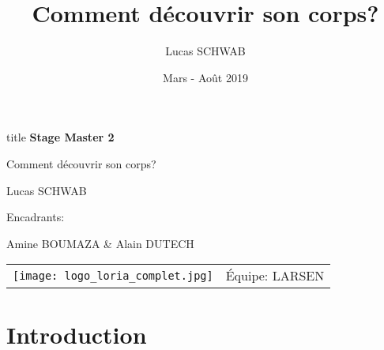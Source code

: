 \documentclass[french]{beamer}
\title{Comment découvrir son corps?}
\author{Lucas SCHWAB}
\date{Mars - Août 2019}
\begin{document}
\begin{frame}
    \begin{center}
        \begin{beamercolorbox}[sep=8pt,center]{title}
            \Huge \textbf{Stage Master 2}

            \huge Comment découvrir son corps?
        \end{beamercolorbox}
        \vfill

        Lucas SCHWAB

        \vfill

        Encadrants:

        Amine BOUMAZA
        \&
        Alain DUTECH

        \vfill

        \begin{tabular}{m{} m{}}
            \texttt{[image: logo\_loria\_complet.jpg]}
            &
            \'Equipe:
            LARSEN
        \end{tabular}
    \end{center}

\end{frame}


\begin{frame}
    \hfill
    \parbox[t]{.88\textwidth}{
        \begin{minipage}[c][0.75\textheight]{0.88\textwidth}
        \tableofcontents
        \end{minipage}
    }
\end{frame}

\section{Introduction}

\end{document}

